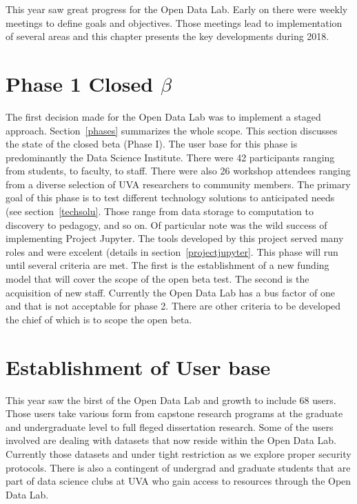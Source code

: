 This year saw great progress for the Open Data Lab. Early on there were weekly meetings to define goals and objectives. Those meetings lead to implementation of several areas and this chapter presents the key developments during 2018.

\section{Phase 1 Closed $\beta$}
The first decision made for the Open Data Lab was to implement a staged approach. Section~\ref{phases} summarizes the whole scope. This section discusses the state of the closed beta (Phase I). The user base for this phase is predominantly the Data Science Institute. There were 42 participants ranging from students, to faculty, to staff. There were also 26 workshop attendees ranging from a diverse selection of UVA researchers to community members.
The primary goal of this phase is to test different technology solutions to anticipated needs (see section~\ref{techsolu}. Those range from data storage to computation to discovery to pedagogy, and so on. Of particular note was the wild success of implementing Project Jupyter. The tools developed by this project served many roles and were excelent (details in section~\ref{projectjupyter}.
This phase will run until several criteria are met. The first is the establishment of a new funding model that will cover the scope of the open beta test. The second is the acquisition of new staff. Currently the Open Data Lab has a bus factor of one and that is not acceptable for phase 2. There are other criteria to be developed the chief of which is to scope the open beta.

\section{Establishment of User base}
This year saw the birst of the Open Data Lab and growth to include 68 users. Those users take various form from capstone research programs at the graduate and undergraduate level to full fleged dissertation research. Some of the users involved are dealing with datasets that now reside within the Open Data Lab. Currently those datasets and under tight restriction as we explore proper security protocols. There is also a contingent of undergrad and graduate students that are part of data science clubs at UVA who gain access to resources through the Open Data Lab.

